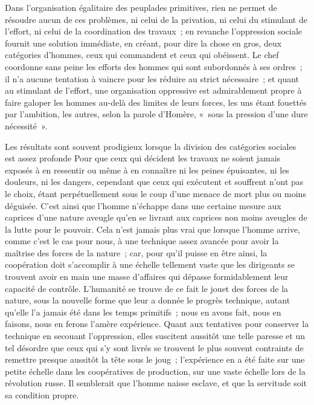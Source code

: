 \documentclass[french,twoside]{book} %
\begin{document}
Dans l'organisation égalitaire des peuplades primitives, rien ne permet de résoudre aucun de ces problèmes, ni celui de la privation, ni celui du stimulant de l'effort, ni celui de la coordination des travaux ; en revanche l'oppression sociale fournit une solution immédiate, en créant, pour dire la chose en gros, deux catégories d'hommes, ceux qui commandent et ceux qui obéissent. Le chef coordonne sans peine les efforts des hommes qui sont subordonnés à ses ordres ; il n'a aucune tentation à vaincre pour les réduire au strict nécessaire ; et quant au stimulant de l'effort, une organisation oppressive est admirablement propre à faire galoper les hommes au-delà des limites de leurs forces, les uns étant fouettés par l'ambition, les autres, selon la parole d'Homère, « sous la pression d'une dure nécessité ».\par
Les résultats sont souvent prodigieux lorsque la division des catégories sociales est assez profonde Pour que ceux qui décident les travaux ne soient jamais exposés à en ressentir ou même à en connaître ni les peines épuisantes, ni les douleurs, ni les dangers, cependant que ceux qui exécutent et souffrent n'ont pas le choix, étant perpétuellement sous le coup d'une menace de mort plus ou moins déguisée. C'est ainsi que l'homme n'échappe dans une certaine mesure aux caprices d'une nature aveugle qu'en se livrant aux caprices non moins aveugles de la lutte pour le pouvoir. Cela n'est jamais plus vrai que lorsque l'homme arrive, comme c'est le cas pour nous, à une technique assez avancée pour avoir la maîtrise des forces de la nature ; car, pour qu'il puisse en être ainsi, la coopération doit s'accomplir à une échelle tellement vaste que les dirigeants se trouvent avoir en main une masse d'affaires qui dépasse formidablement leur capacité de contrôle. L'humanité se trouve de ce fait le jouet des forces de la nature, sous la nouvelle forme que leur a donnée le progrès technique, autant qu'elle l'a jamais été dans les temps primitifs ; nous en avons fait, nous en faisons, nous en ferons l'amère expérience. Quant aux tentatives pour conserver la technique en secouant l'oppression, elles suscitent aussitôt une telle paresse et un tel désordre que ceux qui s'y sont livrés se trouvent le plus souvent contraints de remettre presque aussitôt la tête sous le joug ; l'expérience en a été faite sur une petite échelle dans les coopératives de production, sur une vaste échelle lors de la révolution russe. Il semblerait que l'homme naisse esclave, et que la servitude soit sa condition propre.\par
\end{document}
